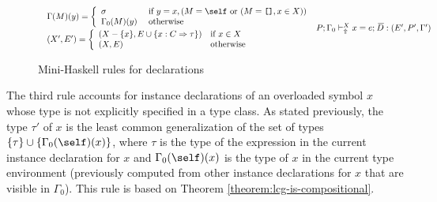 \begin{figure}
\begin{mdframed}
\[\begin{array}{cc}
{\begin{array}{l}
           \Gamma(M)(y) = \left\{ \begin{array}{ll}
                                    \sigma & \text{ if } y = x, (M = \self \text{ or }
                                                                 (M = \texttt{[]}, x \in X)) \\
                                      \Gamma_0(M)(y) & \text{ otherwise } 
                                   \end{array}\right.\\[.3cm]                   
           (X',E') = \left\{ \begin{array}{ll}
                               (X - \{ x \}, E \cup \{x : C\Rightarrow\tau\}) 
                                   & \text{if } x \in X\\
                               (X, E) & \text{otherwise} 
                             \end{array}\right. 
          \end{array}}
	 {P;\Gamma_0 \vdash_{\Uparrow}^X x = e;\: \overline{\!D} : (E',P',\Gamma')} 
\end{array} \]
\end{mdframed} \vspace{-.3cm}
\caption{Mini-Haskell rules for declarations}
\label{fig:mini-haskell-rules-for-declarations}
\end{figure}



The third rule accounts for instance declarations of
an overloaded symbol $x$ whose type is not explicitly specified in a
type class. As stated previously, the type $\tau'$ of $x$ is the least
common generalization of the set of types $\{\tau\} \cup
\{\Gamma_0(\self)(x)\}$, where $\tau$ is the type of the expression in
the current instance declaration for $x$ and $\Gamma_0(\self)(x)$ is
the type of $x$ in the current type environment (previously computed
from other instance declarations for $x$ that are visible in
$\Gamma_0$). This rule is based on Theorem
\ref{theorem:lcg-is-compositional}.
